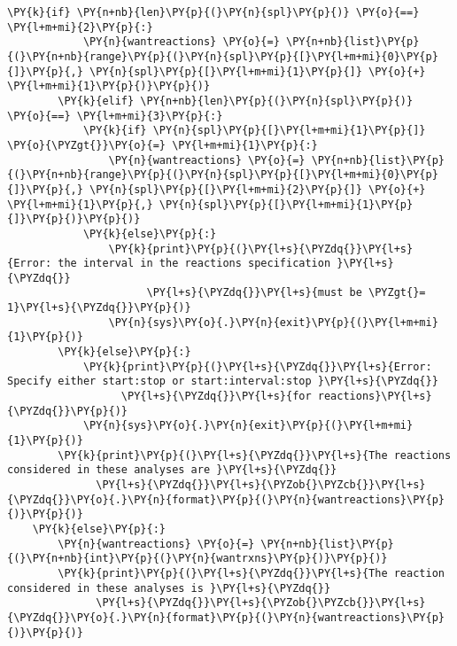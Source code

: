 \begin{Verbatim}[commandchars=\\\{\}]
        \PY{k}{if} \PY{n+nb}{len}\PY{p}{(}\PY{n}{spl}\PY{p}{)} \PY{o}{==} \PY{l+m+mi}{2}\PY{p}{:}
            \PY{n}{wantreactions} \PY{o}{=} \PY{n+nb}{list}\PY{p}{(}\PY{n+nb}{range}\PY{p}{(}\PY{n}{spl}\PY{p}{[}\PY{l+m+mi}{0}\PY{p}{]}\PY{p}{,} \PY{n}{spl}\PY{p}{[}\PY{l+m+mi}{1}\PY{p}{]} \PY{o}{+} \PY{l+m+mi}{1}\PY{p}{)}\PY{p}{)}
        \PY{k}{elif} \PY{n+nb}{len}\PY{p}{(}\PY{n}{spl}\PY{p}{)} \PY{o}{==} \PY{l+m+mi}{3}\PY{p}{:}
            \PY{k}{if} \PY{n}{spl}\PY{p}{[}\PY{l+m+mi}{1}\PY{p}{]} \PY{o}{\PYZgt{}}\PY{o}{=} \PY{l+m+mi}{1}\PY{p}{:}
                \PY{n}{wantreactions} \PY{o}{=} \PY{n+nb}{list}\PY{p}{(}\PY{n+nb}{range}\PY{p}{(}\PY{n}{spl}\PY{p}{[}\PY{l+m+mi}{0}\PY{p}{]}\PY{p}{,} \PY{n}{spl}\PY{p}{[}\PY{l+m+mi}{2}\PY{p}{]} \PY{o}{+} \PY{l+m+mi}{1}\PY{p}{,} \PY{n}{spl}\PY{p}{[}\PY{l+m+mi}{1}\PY{p}{]}\PY{p}{)}\PY{p}{)}
            \PY{k}{else}\PY{p}{:}
                \PY{k}{print}\PY{p}{(}\PY{l+s}{\PYZdq{}}\PY{l+s}{Error: the interval in the reactions specification }\PY{l+s}{\PYZdq{}}
                      \PY{l+s}{\PYZdq{}}\PY{l+s}{must be \PYZgt{}= 1}\PY{l+s}{\PYZdq{}}\PY{p}{)}
                \PY{n}{sys}\PY{o}{.}\PY{n}{exit}\PY{p}{(}\PY{l+m+mi}{1}\PY{p}{)}
        \PY{k}{else}\PY{p}{:}
            \PY{k}{print}\PY{p}{(}\PY{l+s}{\PYZdq{}}\PY{l+s}{Error: Specify either start:stop or start:interval:stop }\PY{l+s}{\PYZdq{}}
                  \PY{l+s}{\PYZdq{}}\PY{l+s}{for reactions}\PY{l+s}{\PYZdq{}}\PY{p}{)}
            \PY{n}{sys}\PY{o}{.}\PY{n}{exit}\PY{p}{(}\PY{l+m+mi}{1}\PY{p}{)}
        \PY{k}{print}\PY{p}{(}\PY{l+s}{\PYZdq{}}\PY{l+s}{The reactions considered in these analyses are }\PY{l+s}{\PYZdq{}}
              \PY{l+s}{\PYZdq{}}\PY{l+s}{\PYZob{}\PYZcb{}}\PY{l+s}{\PYZdq{}}\PY{o}{.}\PY{n}{format}\PY{p}{(}\PY{n}{wantreactions}\PY{p}{)}\PY{p}{)}
    \PY{k}{else}\PY{p}{:}
        \PY{n}{wantreactions} \PY{o}{=} \PY{n+nb}{list}\PY{p}{(}\PY{n+nb}{int}\PY{p}{(}\PY{n}{wantrxns}\PY{p}{)}\PY{p}{)}
        \PY{k}{print}\PY{p}{(}\PY{l+s}{\PYZdq{}}\PY{l+s}{The reaction considered in these analyses is }\PY{l+s}{\PYZdq{}}
              \PY{l+s}{\PYZdq{}}\PY{l+s}{\PYZob{}\PYZcb{}}\PY{l+s}{\PYZdq{}}\PY{o}{.}\PY{n}{format}\PY{p}{(}\PY{n}{wantreactions}\PY{p}{)}\PY{p}{)}


\end{Verbatim}
